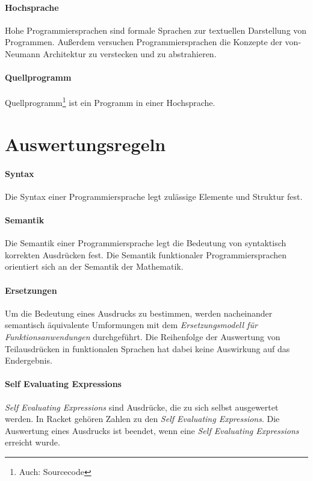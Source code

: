 \documentclass[../main.tex]{subfiles}
\begin{document}
            \paragraph{Hochsprache}
                Hohe Programmiersprachen sind formale Sprachen zur textuellen Darstellung von Programmen. Außerdem versuchen Programmiersprachen die Konzepte der von-Neumann Architektur zu verstecken und zu abstrahieren.
                
            \paragraph{Quellprogramm}
                Quellprogramm\footnote{Auch: Sourcecode} ist ein Programm in einer Hochsprache.
                
    \section{Auswertungsregeln}
        \paragraph{Syntax}
            Die Syntax einer Programmiersprache legt zulässige Elemente und Struktur fest.
            
        \paragraph{Semantik}
            Die Semantik einer Programmiersprache legt die Bedeutung von syntaktisch korrekten Ausdrücken fest. Die Semantik funktionaler Programmiersprachen orientiert sich an der Semantik der Mathematik.
            
        \paragraph{Ersetzungen}
            Um die Bedeutung eines Ausdrucks zu bestimmen, werden nacheinander semantisch äquivalente Umformungen mit dem \emph{Ersetzungsmodell für Funktionsanwendungen} durchgeführt. Die Reihenfolge der Auswertung von Teilausdrücken in funktionalen Sprachen hat dabei keine Auswirkung auf das Endergebnis.
            
        \paragraph{Self Evaluating Expressions}
            \emph{Self Evaluating Expressions} sind Ausdrücke, die zu sich selbst ausgewertet werden. In Racket gehören Zahlen zu den \emph{Self Evaluating Expressions}. Die Auswertung eines Ausdrucks ist beendet, wenn eine \emph{Self Evaluating Expressions} erreicht wurde.
            
\end{document}
